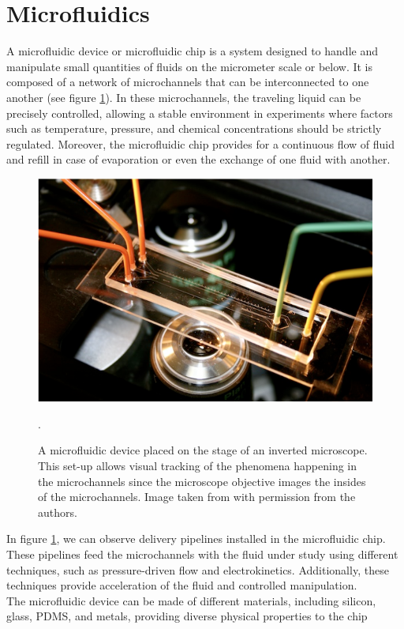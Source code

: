 \documentclass[letterpaper,12pt,oneside]{book}
\begin{document}
\section{Microfluidics}
A microfluidic device or microfluidic chip is a system designed to handle and manipulate small quantities of fluids on the micrometer scale or below. It is composed of a network of microchannels that can be interconnected to one another (see figure \ref{microfluidic_device}). In these microchannels,
the traveling liquid can be precisely controlled, allowing a stable environment in
experiments where factors such as temperature, pressure, and chemical concentrations should be strictly regulated. Moreover, the microfluidic chip provides for a continuous flow of fluid and refill in case of evaporation or even the exchange of one fluid with another.
 \begin{figure}[H]
     \centering
     \includegraphics[scale=0.35]{microfluidicinaction.png}
     \caption{A microfluidic device placed on the stage of an inverted microscope. This set-up allows visual tracking of the phenomena happening in the microchannels since the microscope objective images the insides of the microchannels. Image taken from \cite{Wanucha_2012} with permission from the authors.}
     \label{microfluidic_device} .
 \end{figure}
  In figure \ref{microfluidic_device}, we can observe delivery pipelines installed in the microfluidic chip. These pipelines feed the microchannels with the fluid under study using different techniques, such as pressure-driven flow and electrokinetics. Additionally, these techniques provide acceleration of the fluid and controlled manipulation.\\
 The microfluidic device can be made of different materials, including silicon, glass, PDMS, and metals, providing diverse physical properties to the chip
\end{document}

